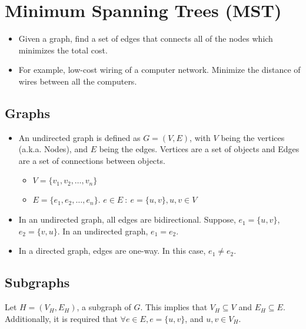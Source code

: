 \documentclass[10pt]{article}
\begin{document}
\section*{Minimum Spanning Trees (MST)}
\begin{itemize}
	\item Given a graph, find a set of edges that connects all of the nodes which minimizes the total cost.
	\item For example, low-cost wiring of a computer network.  Minimize the distance of wires between all the computers.
\end{itemize}
\subsection*{Graphs}
\begin{itemize}
	\item An undirected graph is defined as $G=(V, E)$, with $V$ being the vertices (a.k.a. Nodes), and $E$ being the edges.  Vertices are a set of objects and Edges are a set of connections between objects.
	\begin{itemize}
        \item $V = \{v_1, v_2, \dots, v_n\}$
        \item $E = \{e_1, e_2, \dots, e_n\}$.  $e \in E \::\: e = \{u, v\}, u, v \in V$ 
    \end{itemize}
    \item In an undirected graph, all edges are bidirectional.  Suppose, $e_1 = \{u, v\}$, $e_2 = \{v, u\}$.  In an undirected graph, $e_1 = e_2$.
    \item In a directed graph, edges are one-way.  In this case, $e_1 \neq e_2$.
\end{itemize}
\subsection*{Subgraphs}
Let $H = (V_H, E_H)$, a subgraph of $G$.  This implies that $V_H \subseteq V$ and $E_H \subseteq E$.  Additionally, it is required that $\forall e \in E, e = \{u, v\}$, and $u, v \in V_H$.
\end{document}
